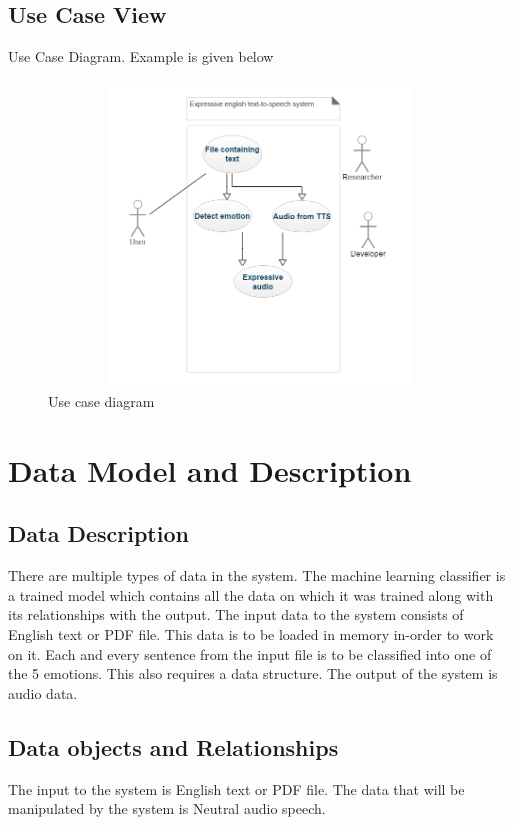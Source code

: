 \documentclass[oneside,a4paper,12pt]{book}
\begin{document}
\subsection{Use Case View}
Use Case Diagram. Example is given below
\begin{center}
	\begin{figure}[!htbp]
		\hspace*{10pt}
		\includegraphics[width=340pt,height=230pt]{usecase.png}
		\caption{Use case diagram}
		\label{fig:usecase}
	\end{figure}
\end{center}  

\section{Data Model and Description}  
\subsection{Data Description}  
There are multiple types of data in the system. The machine learning classifier is a trained model which contains all the data on which it was trained along with its relationships with the output. The input data to the system consists of English text or PDF file. This data is to be loaded in memory in-order to work on it. Each and every sentence from the input file is to be classified into one of the 5 emotions. This also requires a data structure. The output of the system is audio data.  
\subsection{Data objects and Relationships}
The input to the system is English text or PDF file. The data that will be manipulated by the system is Neutral audio speech.
 
\end{document}
